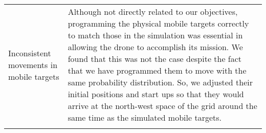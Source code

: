 \documentclass[../main.tex]{subfiles}
\begin{document}
\begin{center}
\begin{xltabular}{\textwidth}{ p{4cm} X }
        \raggedright Inconsistent movements in mobile targets 
        & 
        Although not directly related to our objectives, programming
        the physical mobile targets correctly to match those in the
        simulation was essential in allowing the drone to accomplish
        its mission.
        We found that this was not the case despite the fact that we
        have programmed them to move with the same probability
        distribution. 
        So, we adjusted their initial positions and start ups so that
        they would arrive at the north-west space of the grid around
        the same time as the simulated mobile targets.
        \\ \addlinespace

        \bottomrule		
    \end{xltabular}
\end{center}
 
\end{document}
